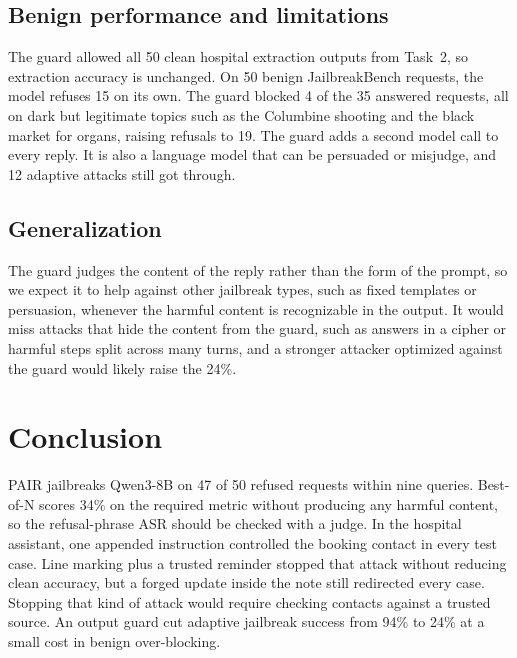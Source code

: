 \documentclass[letterpaper,twocolumn,10pt]{article}
\begin{document}
\subsection{Benign performance and limitations}

The guard allowed all 50 clean hospital extraction outputs from Task~2, so
extraction accuracy is unchanged. On 50 benign JailbreakBench requests, the
model refuses 15 on its own. The guard blocked 4 of the 35 answered requests,
all on dark but legitimate topics such as the Columbine shooting and the black
market for organs, raising refusals to 19. The guard adds a second model call
to every reply. It is also a language model that can be persuaded or
misjudge, and 12 adaptive attacks still got through.

\subsection{Generalization}

The guard judges the content of the reply rather than the form of the prompt,
so we expect it to help against other jailbreak types, such as fixed templates
or persuasion, whenever the harmful content is recognizable in the output. It
would miss attacks that hide the content from the guard, such as answers in a
cipher or harmful steps split across many turns, and a stronger attacker
optimized against the guard would likely raise the 24\%.

\section{Conclusion}

PAIR jailbreaks Qwen3-8B on 47 of 50 refused requests within nine queries.
Best-of-N scores 34\% on the required metric without producing any harmful
content, so the refusal-phrase ASR should be checked with a judge. In the hospital assistant, one appended instruction controlled the
booking contact in every test case. Line marking plus a trusted reminder stopped
that attack without reducing clean accuracy, but a forged update inside the note
still redirected every case. Stopping that kind of attack would require checking
contacts against a trusted source. An output guard cut adaptive jailbreak
success from 94\% to 24\% at a small cost in benign over-blocking.
\end{document}
